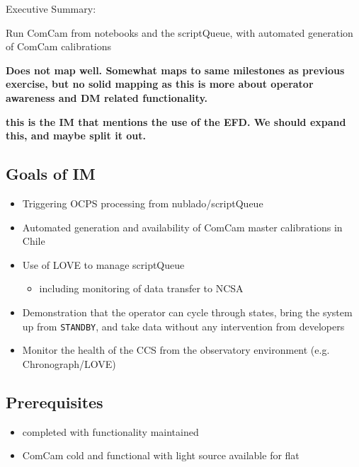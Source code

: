 
Executive Summary:

Run ComCam from notebooks and the scriptQueue, with automated generation of ComCam calibrations

\textbf{Does not map well. Somewhat maps to same milestones as previous exercise, but no solid mapping as this is more about operator awareness and DM related functionality. }

\textbf{\Nb this is the IM that mentions the use of the EFD.  We should expand this, and maybe split it out.}

\subsection{Goals of IM}
\begin{itemize}
	\item Triggering \gls{OCPS} processing from nublado/scriptQueue
	\item Automated generation and availability of ComCam master calibrations in Chile
	\item Use of \gls{LOVE} to manage scriptQueue
	\begin{itemize}
		\item including monitoring of data transfer to NCSA
	\end{itemize}
	\item Demonstration that the operator can cycle through states, bring
	the system up from \texttt{STANDBY}, and take data without any intervention from developers
	\item Monitor the health of the \gls{CCS} from the observatory environment (e.g. Chronograph/\gls{LOVE})
\end{itemize}

\subsection{Prerequisites}
\begin{itemize}
	\item{ completed with functionality maintained}
	\item{ComCam cold and functional with light source available for flat}
\end{itemize}


